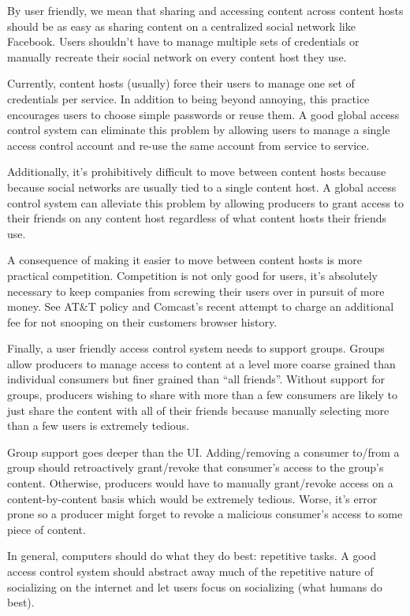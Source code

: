 \documentclass[pdftex,12pt,a4papaer,twoside,notitlepage]{report}
\begin{document}
By user friendly, we mean that sharing and accessing content across content
hosts should be as easy as sharing content on a centralized social network like
Facebook. Users shouldn't have to manage multiple sets of credentials or
manually recreate their social network on every content host they use.

Currently, content hosts (usually) force their users to manage one set of
credentials per service. In addition to being beyond annoying, this practice
encourages users to choose simple passwords or reuse them. A good global access
control system can eliminate this problem by allowing users to manage a single
access control account and re-use the same account from service to service.

Additionally, it's prohibitively difficult to move between content hosts because
because social networks are usually tied to a single content host. A global
access control system can alleviate this problem by allowing producers to
grant access to their friends on any content host regardless of what content
hosts their friends use.

A consequence of making it easier to move between content hosts is more
practical competition. Competition is not only good for users, it's absolutely
necessary to keep companies from screwing their users over in pursuit of more
money. See AT\&T\cite{att} policy and
Comcast's\cite{comcast} recent attempt to charge an additional
fee for not snooping on their customers browser history.

Finally, a user friendly access control system needs to support groups. Groups
allow producers to manage access to content at a level more coarse grained than
individual consumers but finer grained than ``all friends''. Without support for
groups, producers wishing to share with more than a few consumers are likely to
just share the content with all of their friends because manually selecting more
than a few users is extremely tedious.

Group support goes deeper than the UI. Adding/removing a consumer to/from a
group should retroactively grant/revoke that consumer's access to the group's
content. Otherwise, producers would have to manually grant/revoke access on a
content-by-content basis which would be extremely tedious. Worse, it's error
prone so a producer might forget to revoke a malicious consumer's access to some
piece of content.

In general, computers should do what they do best: repetitive tasks. A good
access control system should abstract away much of the repetitive nature of
socializing on the internet and let users focus on socializing (what humans do
best).
\end{document}
